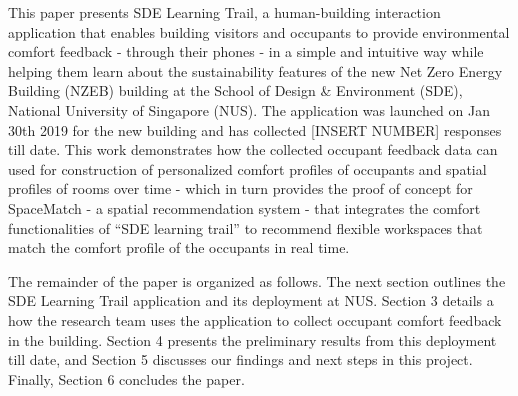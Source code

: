 This paper presents SDE Learning Trail, a human-building interaction application that enables building visitors and occupants to provide environmental comfort feedback - through their phones - in a simple and intuitive way while helping them learn about the sustainability features of the new Net Zero Energy Building (NZEB) building at the School of Design \& Environment (SDE), National University of Singapore (NUS). The application was launched on Jan 30th 2019 for the new building and has collected [INSERT NUMBER] responses till date. This work demonstrates how the collected occupant feedback data can used for construction of personalized comfort profiles of occupants and spatial profiles of rooms over time - which in turn provides the proof of concept for SpaceMatch - a spatial recommendation system - that integrates the comfort functionalities of “SDE learning trail” to recommend flexible workspaces that match the comfort profile of the occupants in real time.

The remainder of the paper is organized as follows. The next section outlines the SDE Learning Trail application and its deployment at NUS. Section 3 details a how the research team uses the application to collect occupant comfort feedback in the building. Section 4 presents the preliminary results from this deployment till date, and Section 5 discusses our findings and next steps in this project. Finally, Section 6 concludes the paper. 







